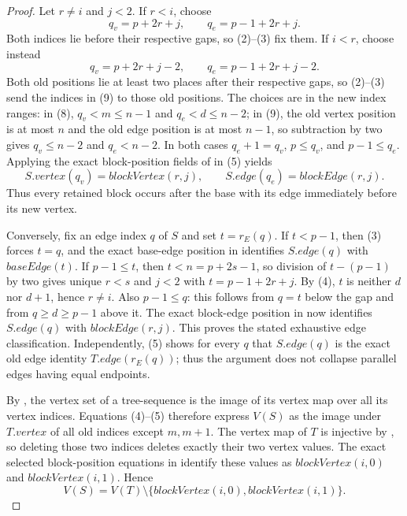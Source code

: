 \begin{proof}
Let $r\ne i$ and $j<2$.  If $r<i$, choose
\[
 q_v=p+2r+j,
 \qquad q_e=p-1+2r+j.
\tag{8}
\]
Both indices lie before their respective gaps, so (2)--(3) fix them.  If
$i<r$, choose instead
\[
 q_v=p+2r+j-2,
 \qquad q_e=p-1+2r+j-2.
\tag{9}
\]
Both old positions lie at least two places after their respective gaps,
so (2)--(3) send the indices in (9) to those old positions.  The choices
are in the new index ranges: in (8), $q_v<m\leq n-1$ and
$q_e<d\leq n-2$; in (9), the old vertex position is at most $n$ and the
old edge position is at most $n-1$, so subtraction by two gives
$q_v\leq n-2$ and $q_e<n-2$.  In both
cases $q_e+1=q_v$, $p\leq q_v$, and $p-1\leq q_e$.  Applying the exact
block-position fields of  in
(5) yields
\[
 S.\mathit{vertex}(q_v)=\mathit{blockVertex}(r,j),
 \qquad
 S.\mathit{edge}(q_e)=\mathit{blockEdge}(r,j).
\tag{10}
\]
Thus every retained block occurs after the base with its edge immediately
before its new vertex.

Conversely, fix an edge index $q$ of $S$ and set $t=r_E(q)$.  If
$t<p-1$, then (3) forces $t=q$, and the exact base-edge position in
 identifies
$S.\mathit{edge}(q)$ with $\mathit{baseEdge}(t)$.  If $p-1\leq t$, then
$t<n=p+2s-1$, so division of $t-(p-1)$ by two gives unique $r<s$ and
$j<2$ with $t=p-1+2r+j$.  By (4), $t$ is neither $d$ nor $d+1$, hence
$r\ne i$.  Also $p-1\leq q$: this follows from $q=t$ below the gap and
from $q\geq d\geq p-1$ above it.  The exact block-edge position in
 now identifies
$S.\mathit{edge}(q)$ with $\mathit{blockEdge}(r,j)$.  This proves the
stated exhaustive edge classification.  Independently, (5) shows for
every $q$ that $S.\mathit{edge}(q)$ is the exact old edge identity
$T.\mathit{edge}(r_E(q))$; thus the argument does not collapse parallel
edges having equal endpoints.

By , the vertex set of a tree-sequence is
the image of its vertex map over all its vertex indices.  Equations
(4)--(5) therefore express $V(S)$ as the image under
$T.\mathit{vertex}$ of all old indices except $m,m+1$.  The vertex map
of $T$ is injective by , so deleting those two
indices deletes exactly their two vertex values.  The exact selected
block-position equations in 
identify these values as
$\mathit{blockVertex}(i,0)$ and $\mathit{blockVertex}(i,1)$.  Hence
\[
 V(S)=V(T)\setminus
 \{\mathit{blockVertex}(i,0),\mathit{blockVertex}(i,1)\}.
\tag{11}
\]


\end{proof}
